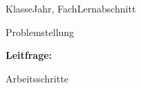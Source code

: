 \documentclass[oneside,openany,headings=optiontotoc,11pt,numbers=noenddot]{scrreprt}
\begin{document}
	\begin{worksheet}{Klasse}{Jahr, Fach}{Lernabschnitt}
		
		\noindent
		\begin{mdframed}[everyline=true]
			Problemstellung
		\end{mdframed}

		\begin{mdframed}[everyline=true]
			\textbf {Leitfrage:}\newline
		\end{mdframed}
	
		\begin{mdframed}[everyline=true]
			Arbeitsschritte
		\end{mdframed}
		
	\end{worksheet}
\end{document}
